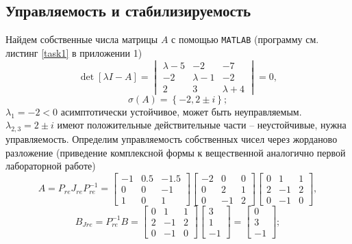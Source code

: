 \documentclass[a4paper, 12pt]{article}
\begin{document}
    
    \subsection{Управляемость и стабилизируемость}
    Найдем собственные числа матрицы $A$ с помощью \texttt{MATLAB} (программу см. листинг \ref{task1} в приложении 1)
    $$
    \det{\left[\lambda I-A\right]}=\begin{vmatrix}
        \lambda-5 &-2 &-7\\
        -2 &\lambda-1 &-2\\
        2 &3 &\lambda+4
    \end{vmatrix}=0,
    $$
    $$
    \sigma\left(A\right)=\left\{-2, 2\pm i\right\};
    $$
    $\lambda_1=-2<0$ асимптотически устойчивое, может быть неуправляемым. $\lambda_{2,3}=2\pm i$ имеют
    положительные действительные части -- неустойчивые, нужна управляемость. Определим управляемость
    собственных чисел через жорданово разложение (приведение комплексной формы к вещественной аналогично первой
    лабораторной работе)
    $$
    A=P_{re}J_{re}P_{re}^{-1}=\begin{bmatrix}
    -1    &0.5   &-1.5\\
    0         &0   &-1\\
    1         &0    &1
    \end{bmatrix}\begin{bmatrix}
    -2     &0     &0\\
     0     &2     &1\\
     0    &-1     &2
    \end{bmatrix}\begin{bmatrix}
    0     &1     &1\\
     2    &-1     &2\\
     0    &-1     &0
    \end{bmatrix},
    $$
    $$
    B_{Jre}=P_{re}^{-1}B=\begin{bmatrix}
        0     &1     &1\\
         2    &-1     &2\\
         0    &-1     &0
        \end{bmatrix}\begin{bmatrix}
            3\\
            1\\
            -1
        \end{bmatrix}=\begin{bmatrix}
        0\\
     3\\
    -1
    \end{bmatrix};
    $$
\end{document}
